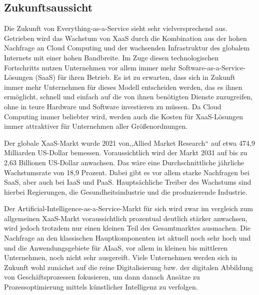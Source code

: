 \newpage
\subsection{Zukunftsaussicht}
Die Zukunft von Everything-as-a-Service sieht sehr vielversprechend aus. Getrieben wird das Wachstum von XaaS durch die Kombination aus der hohen Nachfrage an Cloud Computing und der wachsenden Infrastruktur des globalem Internets mit einer hohen Bandbreite. Im Zuge diesen technologischen Fortschritts nutzen Unternehmen vor allem immer mehr Software-as-a-Service-Lösungen (SaaS) für ihren Betrieb. Es ist zu erwarten, dass sich in Zukunft immer mehr Unternehmen für dieses Modell entscheiden werden, das es ihnen ermöglicht, schnell und einfach auf die von ihnen benötigten Dienste zuzugreifen, ohne in teure Hardware und Software investieren zu müssen. Da Cloud Computing immer beliebter wird, werden auch die Kosten für XaaS-Lösungen immer attraktiver für Unternehmen aller Größenordnungen.

Der globale XaaS-Markt wurde 2021 von,,Allied Market Research`` auf etwa 474,9 Milliarden US-Dollar bemessen. Voraussichtlich wird der Markt 2031 auf bis zu 2,63 Billionen US-Dollar anwachsen. Das wäre eine Durchschnittliche jährliche Wachstumsrate von 18,9 Prozent. Dabei gibt es vor allem starke Nachfragen bei SaaS, aber auch bei IaaS und PaaS. Hauptsächliche Treiber des Wachstums sind hierbei Regierungen, die Gesundheitsindustrie und die produzierende Industrie.

Der Artificial-Intelligence-as-a-Service-Markt für sich wird zwar im vergleich zum allgemeinen XaaS-Markt voraussichtlich prozentual deutlich stärker anwachsen, wird jedoch trotzdem nur einen kleinen Teil des Gesamtmarktes ausmachen. Die Nachfrage an den klassischen Hauptkomponenten ist aktuell noch sehr hoch und und die Anwendungsgebiete für AIaaS, vor allem in kleinen bis mittleren Unternehmen, noch nicht sehr ausgereift. Viele Unternehmen werden sich in Zukunft wohl zunächst auf die reine Digitalisierung bzw. der digitalen Abbildung von Geschäftsprozessen fokusieren, um dann danach Ansätze zu Prozessoptimierung mittels künstlicher Intelligenz zu verfolgen. \cite[vgl.][]{AlliedMarketResearch.2022} \\